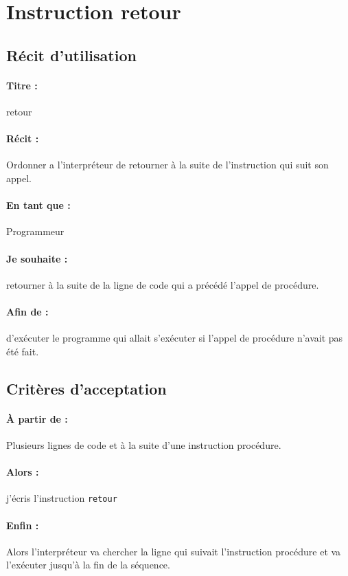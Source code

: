 \section{Instruction retour}

	\subsection*{Récit d'utilisation}

	\paragraph{Titre : } retour
	\paragraph{Récit : } Ordonner a l'interpréteur de retourner à la suite de l'instruction qui suit son appel.
	\paragraph{En tant que : } Programmeur
	\paragraph{Je souhaite : } retourner à la suite de la ligne de code qui a précédé l'appel de procédure.
	\paragraph{Afin de : } d'exécuter le programme qui allait s'exécuter si l'appel de procédure n'avait pas été fait.

	\subsection*{Critères d'acceptation}

	\paragraph{À partir de : } Plusieurs lignes de code et à la suite d'une instruction procédure.

	\paragraph{Alors : } j'écris l'instruction \verb|retour|

	\paragraph{Enfin : } Alors l'interpréteur va chercher la ligne qui suivait l'instruction procédure et va l'exécuter jusqu'à la fin de la séquence.